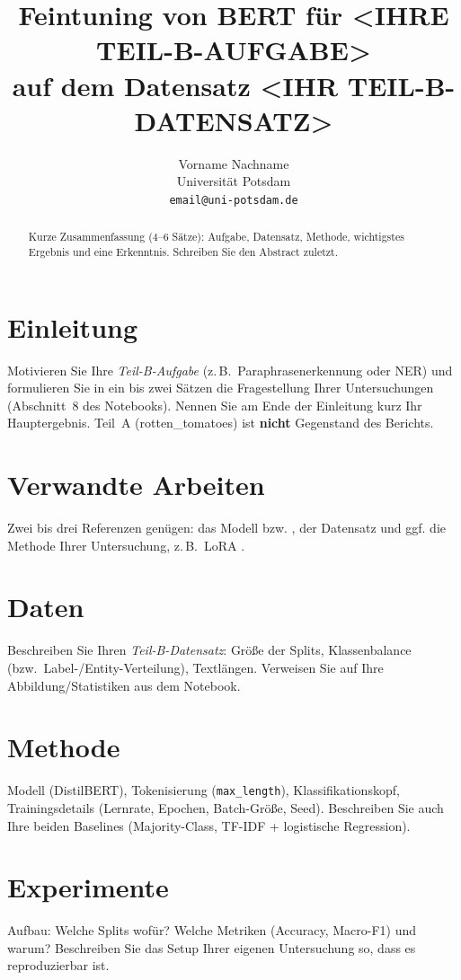 \documentclass[11pt]{article}
\title{Feintuning von BERT für <IHRE TEIL-B-AUFGABE> \\
       auf dem Datensatz <IHR TEIL-B-DATENSATZ>}
\author{Vorname Nachname \\
  Universität Potsdam \\
  \texttt{email@uni-potsdam.de} \\}
\begin{document}
\maketitle

\begin{abstract}
Kurze Zusammenfassung (4--6 Sätze): Aufgabe, Datensatz, Methode, wichtigstes
Ergebnis und eine Erkenntnis. Schreiben Sie den Abstract zuletzt.
\end{abstract}


\section{Einleitung}
Motivieren Sie Ihre \emph{Teil-B-Aufgabe} (z.\,B.\ Paraphrasenerkennung oder
NER) und formulieren Sie in ein bis zwei Sätzen die Fragestellung Ihrer
Untersuchungen (Abschnitt~8 des Notebooks). Nennen Sie am Ende der Einleitung
kurz Ihr Hauptergebnis. Teil~A (rotten\_tomatoes) ist \textbf{nicht} Gegenstand
des Berichts.

\section{Verwandte Arbeiten}
Zwei bis drei Referenzen genügen: das Modell \citep{devlin2019bert} bzw.
\citep{sanh2019distilbert}, der Datensatz \citep{pang2005seeing} und ggf.
die Methode Ihrer Untersuchung, z.\,B.\ LoRA \citep{hu2022lora}.

\section{Daten}
Beschreiben Sie Ihren \emph{Teil-B-Datensatz}: Größe der Splits, Klassenbalance
(bzw.\ Label-/Entity-Verteilung), Textlängen. Verweisen Sie auf Ihre
Abbildung/Statistiken aus dem Notebook.

\section{Methode}
Modell (DistilBERT), Tokenisierung (\texttt{max\_length}), Klassifikationskopf,
Trainingsdetails (Lernrate, Epochen, Batch-Größe, Seed). Beschreiben Sie auch
Ihre beiden Baselines (Majority-Class, TF-IDF + logistische Regression).

\section{Experimente}
Aufbau: Welche Splits wofür? Welche Metriken (Accuracy, Macro-F1) und warum?
Beschreiben Sie das Setup Ihrer eigenen Untersuchung so, dass es
reproduzierbar ist.
\end{document}
